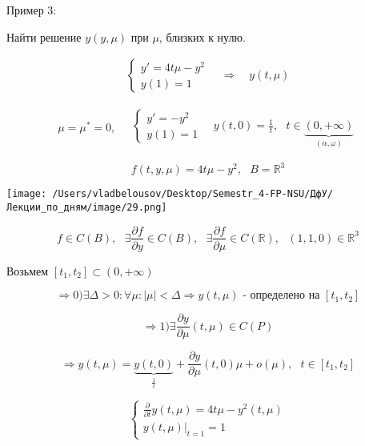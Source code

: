 \documentclass[12pt, a4paper]{report}
\begin{document}
Пример 3: 

Найти решение \( y (y , \mu ) \)  при \( \mu  \), близких к нулю.

\[ \begin{aligned}
    \begin{cases}
        y ' = 4t \mu - y ^2 \\ 
        y (1 ) = 1 
        \end{cases}
        \quad \Rightarrow \quad  
        y(t , \mu)
\end{aligned} \] 

\[ \mu = \mu^ * = 0 , \quad  \begin{aligned}
    \begin{cases}
        y ' = - y ^2  \\ 
        y(1 ) =1 
        \end{cases} 
        \quad  y(t , 0 ) = \frac{1}{ t }  , \text{ } t \in  \underbrace{( 0, + \infty  )}_{(\alpha , \omega)}
\end{aligned} \] 

\[ f ( t ,y ,\mu ) = 4 t \mu - y ^2 , \text{ }  B =\mathbb{R} ^3  \] 

\begin{center}
    \texttt{[image: /Users/vladbelousov/Desktop/Semestr\_4-FP-NSU/ДфУ/Лекции\_по\_дням/image/29.png]}
\end{center}

\[ f  \in  C (B ) , \text{ } \exists  \frac{\partial  f }{\partial y  }  \in  C (B ) , \text{ }  \exists  \frac{\partial  f }{\partial  \mu} \in  C ( \mathbb{R} ) , \text{ }  (1, 1, 0 ) \in \mathbb{R} ^3 \] 

Возьмем  \( [ t_1, t_2 ] \subset (  0, + \infty  ) \) 

\[ \Rightarrow 0 ) \exists  \Delta > 0 :  \forall \mu    : |\mu| < \Delta \Rightarrow y(t, \mu ) \text{ - определено на } [t_1,t_2 ]   \] 

\[ \Rightarrow 1) \exists  \frac{\partial  y }{\partial  \mu } ( t, \mu ) \in  C ( P )  \] 

\[ \Rightarrow y(t, \mu ) = \underbrace{y ( t, 0 )}_{\frac{1}{t  } } + \frac{\partial  y } {\partial  \mu } (t ,0 ) \mu    + o( \mu ) , \text{ } t \in  [t_1,t_2 ]  \] 

\[ \begin{cases}
    \frac{\partial  }{\partial  t } y ( t, \mu ) = 4 t \mu - y ^2 ( t, \mu )  \\
    y ( t ,\mu)  |_{t =1 }  =1 
\end{cases} \] 
\end{document}

